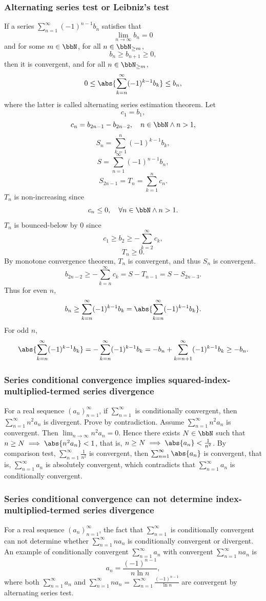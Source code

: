 \documentclass[a4paper,12pt]{report}
\begin{document}
\begin{itemize}
\begin{itemize}
\subsubsection{Alternating series test or Leibniz's test}
If a series $\sum_{n=1}^{\infty}(-1)^{n-1}b_n$ satisfies that
\[\lim_{n\to\infty}b_n=0\]
and for some $m\in\bbN$, for all $n\in\bbN_{\ge m}$,
\[b_n\geq b_{n+1}\geq 0,\]
then it is convergent, and for all $n\in\bbN_{\ge m}$,
\[0\leq\abs{\sum_{k=n}^{\infty}(-1)^{k-1}b_k}\leq b_n,\]
where the latter is called alternating series estimation theorem.
\bpr
Let
\[c_1=b_1,\]
\[c_n=b_{2n-1}-b_{2n-2},\quad n\in\bbN\land n>1,\]
\[S_n=\sum_{k=1}^n(-1)^{k-1}b_k,\]
\[S=\sum_{n=1}^{\infty}(-1)^{n-1}b_n,\]
\[S_{2n-1}=T_n=\sum_{k=1}^nc_n.\]
$T_n$ is non-increasing since
\[c_n\leq 0,\quad\forall n\in\bbN\land n>1.\]
$T_n$ is bounced-below by $0$ since
\[c_1\geq b_2\geq-\sum_{k=2}^{\infty}c_k,\]
\[T_n\geq 0.\]
By monotone convergence theorem, $T_n$ is convergent, and thus $S_n$ is convergent.
\[b_{2n-2}\geq-\sum_{k=n}^{\infty}c_k=S-T_{n-1}=S-S_{2n-3}.\]
Thus for even $n$,
\[b_n\geq\sum_{k=n}^{\infty}(-1)^{k-1}b_k=\abs{\sum_{k=n}^{\infty}(-1)^{k-1}b_k}.\]
For odd $n$,
\[\abs{\sum_{k=n}^{\infty}(-1)^{k-1}b_k}=-\sum_{k=n}^{\infty}(-1)^{k-1}b_k=-b_n+\sum_{k=n+1}^{\infty}(-1)^{k-1}b_k\geq -b_n.\]
\epr
\subsubsection{Series conditional convergence implies squared-index-multiplied-termed series divergence}
For a real sequence $(a_n)_{n=1}^{\infty}$, if $\sum_{n=1}^{\infty}$ is conditionally convergent, then $\sum_{n=1}^{\infty}n^2a_n$ is divergent.
\bpr
Prove by contradiction. Assume $\sum_{n=1}^{\infty}n^2a_n$ is convergent. Then $\lim_{n\to\infty}n^2a_n=0$. Hence there exists $N\in\bbN$ such that $n\ge N\implies\abs{n^2a_n}<1$, that is, $n\ge N\implies\abs{a_n}<\frac{1}{n^2}$. By comparison test, $\sum_{n=1}^{\infty}\frac{1}{n^2}$ is convergent, then $\sum_{n=1}^{\infty}\abs{a_n}$ is convergent, that is, $\sum_{n=1}^{\infty}a_n$ is absolutely convergent, which contradicts that $\sum_{n=1}^{\infty}a_n$ is conditionally convergent.
\epr
\subsubsection{Series conditional convergence can not determine index-multiplied-termed series divergence}
For a real sequence $(a_n)_{n=1}^{\infty}$, the fact that $\sum_{n=1}^{\infty}$ is conditionally convergent can not determine whether $\sum_{n=1}^{\infty}na_n$ is conditionally convergent or divergent.
\bpr
An example of conditionally convergent $\sum_{n=1}^{\infty}a_n$ with convergent $\sum_{n=1}^{\infty}na_n$ is
\[a_n=\frac{(-1)^{n-1}}{n\ln n},\]
where both $\sum_{n=1}^{\infty}a_n$ and $\sum_{n=1}^{\infty}na_n=\sum_{n=1}^{\infty}\frac{(-1)^{n-1}}{\ln n}$ are convergent by alternating series test.


\end{itemize}
\end{itemize}
\end{document}
